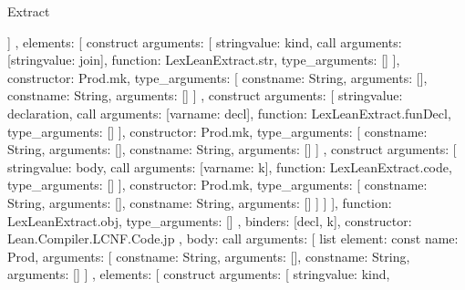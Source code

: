 \begin{lexlean}{Extract}
\begin{toolingmodule}
{{{{{{{                    ]
                  },
                  elements: [
                    construct{
                      arguments: [
                        string{value: kind},
                        call{
                          arguments: [string{value: join}],
                          function: LexLeanExtract.str,
                          type_arguments: []
                        }
                      ],
                      constructor: Prod.mk,
                      type_arguments: [
                        const{name: String, arguments: []},
                        const{name: String, arguments: []}
                      ]
                    },
                    construct{
                      arguments: [
                        string{value: declaration},
                        call{
                          arguments: [var{name: decl}],
                          function: LexLeanExtract.funDecl,
                          type_arguments: []
                        }
                      ],
                      constructor: Prod.mk,
                      type_arguments: [
                        const{name: String, arguments: []},
                        const{name: String, arguments: []}
                      ]
                    },
                    construct{
                      arguments: [
                        string{value: body},
                        call{
                          arguments: [var{name: k}],
                          function: LexLeanExtract.code,
                          type_arguments: []
                        }
                      ],
                      constructor: Prod.mk,
                      type_arguments: [
                        const{name: String, arguments: []},
                        const{name: String, arguments: []}
                      ]
                    }
                  ]
                }
              ],
              function: LexLeanExtract.obj,
              type_arguments: []
            },
            binders: [decl, k],
            constructor: Lean.Compiler.LCNF.Code.jp
          },
          {
            body: call{
              arguments: [
                list{
                  element: const{
                    name: Prod,
                    arguments: [
                      const{name: String, arguments: []},
                      const{name: String, arguments: []}
                    ]
                  },
                  elements: [
                    construct{
                      arguments: [
                        string{value: kind},
}}}}}}}
\end{toolingmodule}
\end{lexlean}
